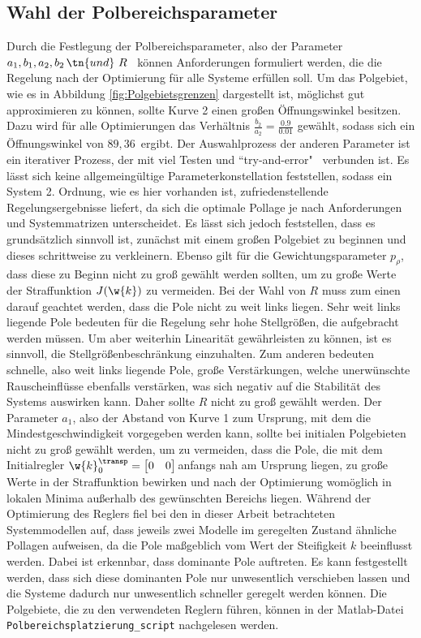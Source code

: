 \subsection{Wahl der Polbereichsparameter}
Durch die Festlegung der Polbereichsparameter, also der Parameter $a_1, b_1, a_2, b_2 \, \tn{und} \,\, R$ \, können Anforderungen formuliert werden, die die Regelung nach der Optimierung für alle Systeme erfüllen soll. Um das Polgebiet, wie es in Abbildung \ref{fig:Polgebietsgrenzen} dargestellt ist, möglichst gut approximieren zu können, sollte Kurve 2 einen großen Öffnungswinkel besitzen. Dazu wird für alle Optimierungen das Verhältnis $\frac{b_2}{a_2} = \frac{0.9}{0.01}$ gewählt, sodass sich ein Öffnungswinkel von $89,36$\textdegree \, ergibt. Der Auswahlprozess der anderen Parameter ist ein iterativer Prozess, der mit viel Testen und ``try-and-error" \, verbunden ist. Es lässt sich keine allgemeingültige Parameterkonstellation feststellen, sodass ein System 2. Ordnung, wie es hier vorhanden ist, zufriedenstellende Regelungsergebnisse liefert, da sich die optimale Pollage je nach Anforderungen und Systemmatrizen unterscheidet. Es lässt sich jedoch feststellen, dass es grundsätzlich sinnvoll ist, zunächst mit einem großen Polgebiet zu beginnen und dieses schrittweise zu verkleinern. Ebenso gilt für die Gewichtungsparameter $p_\rho$, dass diese zu Beginn nicht zu groß gewählt werden sollten, um zu große Werte der Straffunktion $J(\w{k})$ zu vermeiden. Bei der Wahl von $R$ muss zum einen darauf geachtet werden, dass die Pole nicht zu weit links liegen. Sehr weit links liegende Pole bedeuten für die Regelung sehr hohe Stellgrößen, die aufgebracht werden müssen. Um aber weiterhin Linearität gewährleisten zu können, ist es sinnvoll, die Stellgrößenbeschränkung einzuhalten. Zum anderen bedeuten schnelle, also weit links liegende Pole, große Verstärkungen, welche unerwünschte Rauscheinflüsse ebenfalls verstärken, was sich negativ auf die Stabilität des Systems auswirken kann. Daher sollte $R$ nicht zu groß gewählt werden. Der Parameter $a_1$, also der Abstand von Kurve 1 zum Ursprung, mit dem die Mindestgeschwindigkeit vorgegeben werden kann, sollte bei initialen Polgebieten nicht zu groß gewählt werden, um zu vermeiden, dass die Pole, die mit dem Initialregler $\w{k}_0^\transp = \begin{bmatrix}	0 & 0 \\ \end{bmatrix} \, $anfangs nah am Ursprung liegen, zu große Werte in der Straffunktion bewirken und nach der Optimierung womöglich in lokalen Minima außerhalb des gewünschten Bereichs liegen. Während der Optimierung des Reglers fiel bei den in dieser Arbeit betrachteten Systemmodellen auf, dass jeweils zwei Modelle im geregelten Zustand ähnliche Pollagen aufweisen, da die Pole maßgeblich vom Wert der Steifigkeit $k$ beeinflusst werden. Dabei ist erkennbar, dass dominante Pole auftreten. Es kann festgestellt werden, dass sich diese dominanten Pole nur unwesentlich verschieben lassen und die Systeme dadurch nur unwesentlich schneller geregelt werden können. Die Polgebiete, die zu den verwendeten Reglern führen, können in der Matlab-Datei \texttt{Polbereichsplatzierung\_script} nachgelesen werden.

